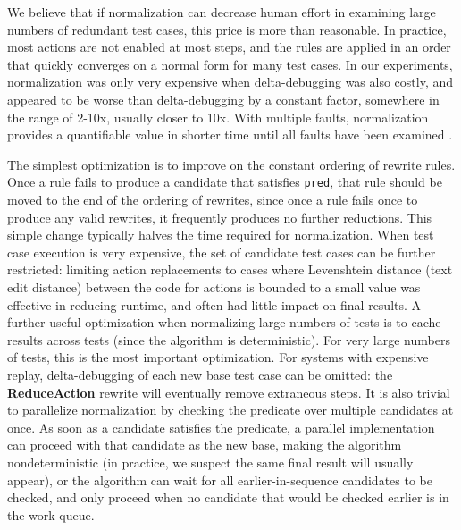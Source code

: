 We believe that if normalization can decrease human effort in
examining large numbers of redundant test cases, this price is more
than reasonable.  In practice, most actions are not enabled at most
steps, and the rules are applied in an order that quickly converges on
a normal form for many test cases.  In our experiments, normalization
was only very expensive when delta-debugging was also costly, and
appeared to be worse than delta-debugging by a constant factor,
somewhere in the range of 2-10x, usually closer to 10x.  With multiple
faults, normalization provides a quantifiable value in
shorter time until all faults have been examined \cite{PLDI13}.


The simplest optimization is to improve on the constant ordering of
rewrite rules.  Once a rule fails to produce a candidate that
satisfies {\tt pred}, that rule should be moved to the end of the
ordering of rewrites, since once a rule fails once to produce any
valid rewrites, it frequently produces no further reductions.  This
simple change typically halves the time required for normalization.
When test case execution is very expensive, the set of candidate test
cases can be further restricted: limiting action replacements to cases
where Levenshtein \cite{Lev} distance (text edit distance) between the
code for actions is bounded to a small value was effective in
reducing runtime, and often had little impact on final results.
A further useful optimization when normalizing large numbers of tests
is to cache results across tests (since the algorithm is deterministic).   For very large
numbers of tests, this is the most important optimization.
For systems with
expensive replay, delta-debugging of each new base test case
can be omitted: the {\bf ReduceAction} rewrite will
eventually remove extraneous steps.  
It is also trivial to parallelize normalization by
checking the predicate over multiple candidates at once.  As soon as a
candidate satisfies the predicate, a parallel implementation can proceed with that candidate as the new
base, making the algorithm nondeterministic (in practice, we suspect
the same final result will usually appear), or the algorithm can wait
for all earlier-in-sequence candidates to be checked, and only proceed
when no candidate that would be checked earlier is in the work queue.

